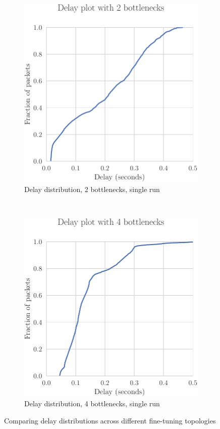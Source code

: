\begin{figure}[h]
    \centering
    \begin{subfigure}[h]{0.5\textwidth}
        \centering
        \includegraphics[scale=0.55]{figures/delay2.pdf}
        \caption{Delay distribution, 2 bottlenecks, single run}
    \end{subfigure}%
    ~ 
    \begin{subfigure}[h]{0.5\textwidth}
        \centering
        \includegraphics[scale=0.55]{figures/delay4.pdf}
        \caption{Delay distribution, 4 bottlenecks, single run}
    \end{subfigure}
    \caption{Comparing delay distributions across different fine-tuning topologies}
    \label{fig:multibottle}
\end{figure}


